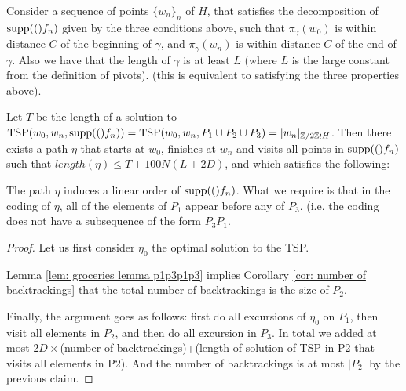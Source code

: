 \begin{lem}
	Consider a sequence of points $\{w_n\}_n$ of $H$, that satisfies the decomposition of $\mathrm{supp}(()f_n)$ given by the three conditions above, such that $\pi_{\gamma}(w_0)$ is within distance $C$ of the beginning of $\gamma$, and $\pi_{\gamma}(w_n)$  is within distance $C$ of the end of $\gamma$. Also we have that the length of $\gamma$ is at least $L$ (where $L$ is the large constant from the definition of pivots). (this is equivalent to satisfying the three properties above).
	
	Let $T$ be the length of a solution to $\mathrm{TSP}(w_0,w_n,\mathrm{supp}(()f_n))=\mathrm{TSP}(w_0,w_n,P_1\cup P_2\cup P_3)=|w_n|_{\mathbb{Z}/2\mathbb{Z} \wr H}$. Then there exists a path $\eta$ that starts at $w_0$, finishes at $w_n$ and visits all points in $\mathrm{supp}(()f_n)$ such that $length(\eta)\le T+100 N (L+2D)$, and which satisfies the following:
	
	The path $\eta$ induces a linear order of $\mathrm{supp}(()f_n)$. What we require is that in the coding of $\eta$, all of the elements of $P_1$ appear before any of $P_3$. (i.e. the coding does not have a subsequence of the form $P_3 P_1$.
\end{lem}
\begin{proof}
	
	Let us first consider $\eta_0$ the optimal solution to the TSP. 
	
	
	Lemma \ref{lem: groceries lemma p1p3p1p3} implies Corollary \ref{cor: number of backtrackings} that the total number of backtrackings is the size of $P_2$.
	
	Finally, the argument goes as follows: first do all excursions of $\eta_0$ on $P_1$, then visit all elements in $P_2$, and then do all excursion in $P_3$. In total we added at most $2D\times$(number of backtrackings)+(length of solution of TSP in P2 that visits all elements in P2). And the number of backtrackings is at most $|P_2|$ by the previous claim.
	
\end{proof}
